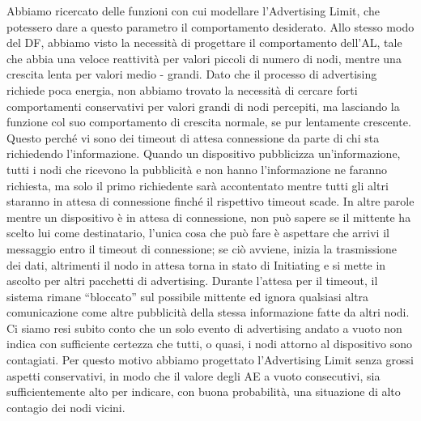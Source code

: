 Abbiamo ricercato delle funzioni con cui modellare l'Advertising Limit, che potessero dare a questo parametro il comportamento desiderato. Allo stesso modo del \acs{DF}, abbiamo visto la necessità di progettare il comportamento dell'\acs{AL}, tale che abbia una veloce reattività per valori piccoli di numero di nodi, mentre una crescita lenta per valori medio - grandi. Dato che il processo di advertising richiede poca energia, non abbiamo trovato la necessità di cercare forti comportamenti conservativi per valori grandi di nodi percepiti, ma lasciando la funzione col suo comportamento di crescita normale, se pur lentamente crescente. Questo perché vi sono dei timeout di attesa connessione da parte di chi sta richiedendo l'informazione. Quando un dispositivo pubblicizza un'informazione, tutti i nodi che ricevono la pubblicità e non hanno l'informazione ne faranno richiesta, ma solo il primo richiedente sarà accontentato mentre tutti gli altri staranno in attesa di connessione finché il rispettivo timeout scade. In altre parole mentre un dispositivo è in attesa di connessione, non può sapere se il mittente ha scelto lui come destinatario, l'unica cosa che può fare è aspettare che arrivi il messaggio entro il timeout di connessione; se ciò avviene, inizia la trasmissione dei dati, altrimenti il nodo in attesa torna in stato di Initiating e si mette in ascolto per altri pacchetti di advertising. Durante l'attesa per il timeout, il sistema rimane “bloccato” sul possibile mittente ed ignora qualsiasi altra comunicazione come altre pubblicità della stessa informazione fatte da altri nodi. Ci siamo resi subito conto che un solo evento di advertising andato a vuoto non indica con sufficiente certezza che tutti, o quasi, i nodi attorno al dispositivo sono contagiati. Per questo motivo abbiamo progettato l'Advertising Limit senza grossi aspetti conservativi, in modo che il valore degli \acs{AE} a vuoto consecutivi, sia sufficientemente alto per indicare, con buona probabilità, una situazione di alto contagio dei nodi vicini.

